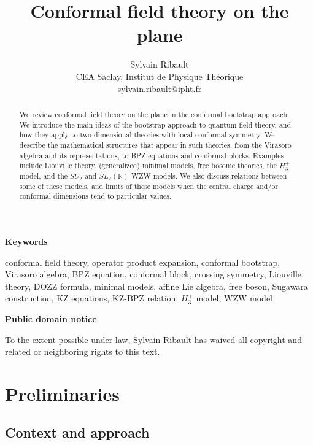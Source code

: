 \documentclass[12pt, a4paper, notitlepage, twoside]{report}
\title{\bfseries Conformal field theory on the plane}
\author{Sylvain Ribault \vspace{2mm}
\\
{\normalsize CEA Saclay, Institut de Physique Th\'eorique}
 \\
 {\footnotesize \ttfamily sylvain.ribault@ipht.fr }
}
\date{}
\numberwithin{equation}{section}
\theoremstyle{break}
\begin{document}
\maketitle


\begin{abstract}
We review conformal field theory on the plane in the conformal bootstrap approach.
We introduce the main ideas of the bootstrap approach to quantum field theory, and how they apply to two-dimensional theories with local conformal symmetry.
We describe the mathematical structures that appear in such theories, from the Virasoro algebra and its representations, to BPZ equations and conformal blocks.
Examples include Liouville theory, (generalized) minimal models, free bosonic theories, the $H_3^+$ model, and the $SU_2$ and $\widetilde{SL}_2(\mathbb{R})$ WZW models. 
We also discuss relations between some of these models, and limits of these models when the central charge and/or conformal dimensions tend to particular values.
\end{abstract}

\vspace{1cm}
\begin{center}
 \textbf{Keywords}
\end{center}
\noindent conformal field theory, operator product expansion, conformal bootstrap, Virasoro algebra, BPZ equation, conformal block, crossing symmetry, Liouville theory, DOZZ formula, minimal models, affine Lie algebra, free boson, Sugawara construction,
KZ equations, KZ-BPZ relation, $H_3^+$ model, WZW model

\vspace{1cm}
\begin{center}
\textbf{Public domain notice}
\end{center}
\noindent To the extent possible under law, Sylvain Ribault has waived all copyright and related or neighboring rights to this text.

\tableofcontents
\hypersetup{linkcolor=blue}

\addtocounter{chapter}{-1}

\chapter{Preliminaries \label{secprel}}

\section{Context and approach}
\end{document}
